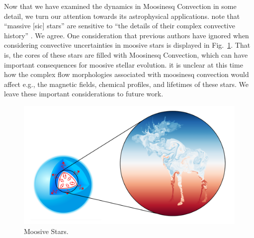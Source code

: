 Now that we have examined the dynamics in Moosinesq Convection in some detail, we turn our attention towards its astrophysical applications.
\citet{kaiser_etal_2020} note that ``massive [sic] stars'' are sensitive to ``the details of their complex convective history'' \citep{kaiser_etal_2020}.
We agree.
One consideration that previous authors have ignored when considering convective uncertainties in moosive stars is displayed in Fig.~\ref{fig:moosive_stars}.
That is, the cores of these stars are filled with Moosinesq Convection, which can have important consequences for moosive stellar evolution.
it is unclear at this time how the complex flow morphologies associated with moosinesq convection would affect e.g., the magnetic fields, chemical profiles, and lifetimes of these stars.
We leave these important considerations to future work.

\begin{figure}[t!]
\centering
    \includegraphics[width=\textwidth]{moosive_stars.pdf}
\caption{ Moosive Stars.
\label{fig:moosive_stars}
}
\end{figure}


